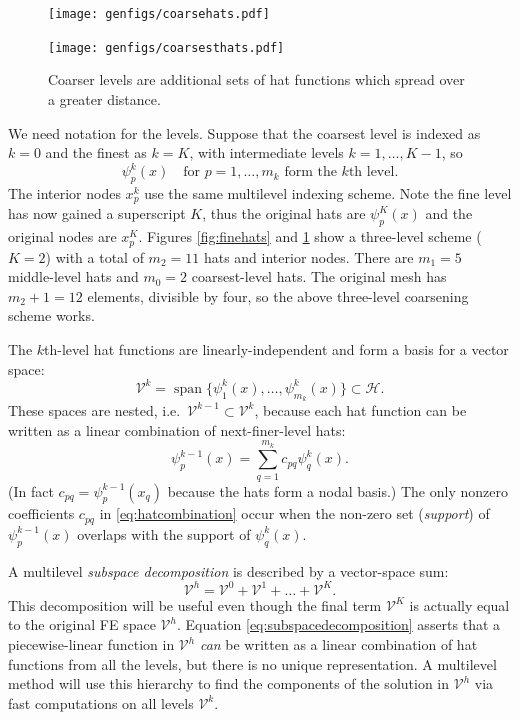 \documentclass[letterpaper,final,12pt,reqno]{amsart}
\numberwithin{equation}{section}
\numberwithin{figure}{section}
\numberwithin{table}{section}
\begin{document}
\begin{figure}
\texttt{[image: genfigs/coarsehats.pdf]}
\smallskip

\texttt{[image: genfigs/coarsesthats.pdf]}
\caption{Coarser levels are additional sets of hat functions which spread over a greater distance.}
\label{fig:coarsehats}
\end{figure}

We need notation for the levels.  Suppose that the coarsest level is indexed as $k=0$ and the finest as $k=K$, with intermediate levels $k=1,\dots,K-1$, so
\begin{equation}
  \psi_p^k(x) \quad \text{for } p=1,\dots,m_k \text{ form the $k$th level}.  \label{eq:definepsijk}
\end{equation}
The interior nodes $x_p^k$ use the same multilevel indexing scheme.  Note the fine level has now gained a superscript $K$, thus the original hats are $\psi_p^K(x)$ and the original nodes are $x_p^K$.  Figures \ref{fig:finehats} and \ref{fig:coarsehats} show a three-level scheme ($K=2$) with a total of $m_2=11$ hats and interior nodes.  There are $m_1=5$ middle-level hats and $m_0=2$ coarsest-level hats.  The original mesh has $m_2+1=12$ elements, divisible by four, so the above three-level coarsening scheme works.

The $k$th-level hat functions are linearly-independent and form a basis for a vector space:
\begin{equation}
  \mathcal{V}^k = \operatorname{span}\{\psi_1^k(x),\dots,\psi_{m_k}^k(x)\} \subset \mathcal{H}.  \label{eq:definevk}
\end{equation}
These spaces are nested, i.e.~$\mathcal{V}^{k-1} \subset \mathcal{V}^k$, because each hat function can be written as a linear combination of next-finer-level hats:
\begin{equation}
   \psi_p^{k-1}(x) = \sum_{q=1}^{m_k} c_{pq} \psi_q^k(x). \label{eq:hatcombination}
\end{equation}
(In fact $c_{pq} = \psi_p^{k-1}(x_q)$ because the hats form a nodal basis.)  The only nonzero coefficients $c_{pq}$ in \eqref{eq:hatcombination} occur when the non-zero set (\emph{support}) of $\psi_p^{k-1}(x)$ overlaps with the support of $\psi_q^k(x)$.

A multilevel \emph{subspace decomposition} is described by a vector-space sum:
\begin{equation}
  \mathcal{V}^h = \mathcal{V}^0 + \mathcal{V}^1 + \dots + \mathcal{V}^K. \label{eq:subspacedecomposition}
\end{equation}
This decomposition will be useful even though the final term $\mathcal{V}^K$ is actually equal to the original FE space $\mathcal{V}^h$.  Equation \eqref{eq:subspacedecomposition} asserts that a piecewise-linear function in $\mathcal{V}^h$ \emph{can} be written as a linear combination of hat functions from all the levels, but there is no unique representation.  A multilevel method will use this hierarchy to find the components of the solution in $\mathcal{V}^h$ via fast computations on all levels $\mathcal{V}^k$.
\end{document}
